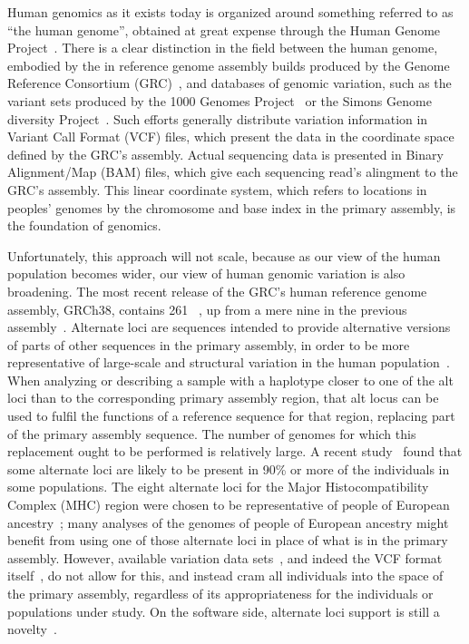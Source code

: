 Human genomics as it exists today is organized around something referred to as ``the human genome'', obtained at great expense through the Human Genome Project~\cite{powledge2003human}. There is a clear distinction in the field between the human genome, embodied by the  in reference genome assembly builds produced by the Genome Reference Consortium (GRC)~\cite{schneider2013genome}, and databases of genomic variation, such as the variant sets produced by the 1000 Genomes Project~\cite{10002015global} or the Simons Genome diversity Project~\cite{simons2014simons,simons2017simons}. Such efforts generally distribute variation information in Variant Call Format (VCF) files, which present the data in the coordinate space defined by the GRC's assembly. Actual sequencing data is presented in Binary Alignment/Map (BAM) files, which give each sequencing read's alingment to the GRC's assembly. This linear coordinate system, which refers to locations in peoples' genomes by the chromosome and base index in the primary assembly, is the foundation of genomics.

Unfortunately, this approach will not scale, because as our view of the human population becomes wider, our view of human genomic variation is also broadening. The most recent release of the GRC's human reference genome assembly, GRCh38, contains 261 ~\cite{grc2013announcing}, up from a mere nine in the previous assembly~\cite{grc2009grch37}. Alternate loci are sequences intended to provide alternative versions of parts of other sequences in the primary assembly, in order to be more representative of large-scale and structural variation in the human population~\cite{karolchik2014new}. When analyzing or describing a sample with a haplotype closer to one of the alt loci than to the corresponding primary assembly region, that alt locus can be used to fulfil the functions of a reference sequence for that region, replacing part of the primary assembly sequence. The number of genomes for which this replacement ought to be performed is relatively large. A recent study~\cite{jager2016alternate} found that some alternate loci are likely to be present in 90\% or more of the individuals in some populations. The eight alternate loci for the Major Histocompatibility Complex (MHC) region were chosen to be representative of people of European ancestry~\cite{horton2008variation}; many analyses of the genomes of people of European ancestry might benefit from using one of those alternate loci in place of what is in the primary assembly. However, available variation data sets~\cite{10002015global}, and indeed the VCF format itself~\cite{danecek2011variant,marshall2013variant}, do not allow for this, and instead cram all individuals into the space of the primary assembly, regardless of its appropriateness for the individuals or populations under study. On the software side, alternate loci support is still a novelty~\cite{jager2016alternate}.

